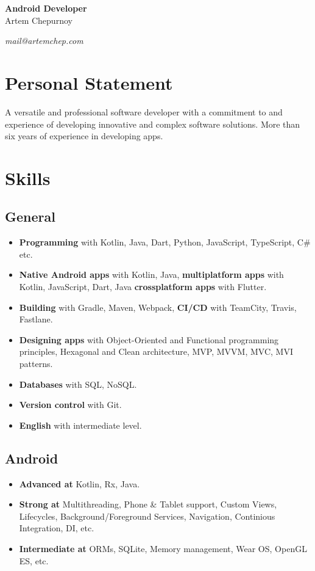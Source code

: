 \documentclass[a4paper]{article}
\begin{document}
	\begin{center}
		{\huge\bfseries Android Developer} \\[1em]
		{\Large Artem Chepurnoy} \\[1em]
		\faMapMarker \quad \myaddress
	\end{center}
	\vspace{1em}
	\textit{\faPaperPlane \quad mail@artemchep.com} \hspace*{\fill} \textit{\faPhone \quad \myphone} 

	\section*{Personal Statement}
	A versatile and professional software developer with a commitment to and experience of developing innovative and complex software solutions. 
	More than six years of experience in developing apps.

	\section*{Skills}
	\subsection*{General}
	\begin{multicols}{2}
	\begin{itemize}
		\item \textbf{Programming} with Kotlin, Java, Dart, Python, JavaScript, TypeScript, C\# etc.
		\item \textbf{Native Android apps} with Kotlin, Java, \textbf{multiplatform apps} with Kotlin, JavaScript, Dart, Java \textbf{crossplatform apps} with Flutter.
		\item \textbf{Building} with Gradle, Maven, Webpack, \textbf{CI/CD} with TeamCity, Travis, Fastlane.
		\item \textbf{Designing apps} with Object-Oriented and Functional programming principles, Hexagonal and Clean architecture, MVP, MVVM, MVC, MVI patterns.
		\item \textbf{Databases} with SQL, NoSQL.
		\item \textbf{Version control} with Git.
		\item \textbf{English} with intermediate level.
	\end{itemize}
	\end{multicols}
	\subsection*{Android}
	\begin{multicols}{2}
	\begin{itemize}
		\item \textbf{Advanced at} Kotlin, Rx, Java.
		\item \textbf{Strong at} Multithreading, Phone \& Tablet support, Custom Views, Lifecycles, Background/Foreground Services, Navigation, Continious Integration, DI, etc.
		\item \textbf{Intermediate at} ORMs, SQLite, Memory management, Wear OS, OpenGL ES, etc.
	\end{itemize}
	\end{multicols}
\end{document}
